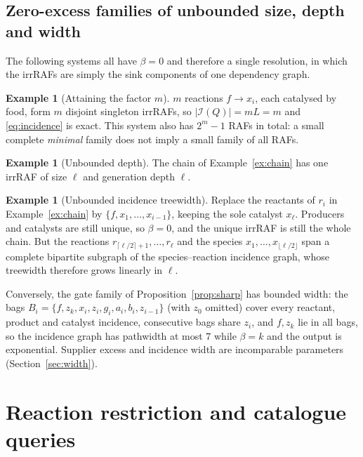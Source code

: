 \documentclass[11pt,a4paper]{article}
\theoremstyle{plain}
\theoremstyle{definition}
\newtheorem{example}[theorem]{Example}
\theoremstyle{remark}
\newcommand{\Irr}{\mathcal I}
\begin{document}
\subsection{Zero-excess families of unbounded size, depth and width}\label{sec:zerofamilies}

The following systems all have $\beta=0$ and therefore a single resolution, in which the irrRAFs are simply the sink components of one dependency graph.

\begin{example}[Attaining the factor $m$]
$m$ reactions $f\to x_i$, each catalysed by food, form $m$ disjoint singleton irrRAFs, so $|\Irr(Q)|=mL=m$ and \eqref{eq:incidence} is exact. This system also has $2^m-1$ RAFs in total: a small complete \emph{minimal} family does not imply a small family of all RAFs.
\end{example}

\begin{example}[Unbounded depth]
The chain of Example~\ref{ex:chain} has one irrRAF of size $\ell$ and generation depth $\ell$.
\end{example}

\begin{example}[Unbounded incidence treewidth]\label{ex:dense}
Replace the reactants of $r_i$ in Example~\ref{ex:chain} by $\{f,x_1,\ldots,x_{i-1}\}$, keeping the sole catalyst $x_\ell$. Producers and catalysts are still unique, so $\beta=0$, and the unique irrRAF is still the whole chain. But the reactions $r_{\lceil\ell/2\rceil+1},\ldots,r_\ell$ and the species $x_1,\ldots,x_{\lfloor\ell/2\rfloor}$ span a complete bipartite subgraph of the species--reaction incidence graph, whose treewidth therefore grows linearly in $\ell$.
\end{example}

Conversely, the gate family of Proposition~\ref{prop:sharp} has bounded width: the bags $B_i=\{f,z_k,x_i,z_i,g_i,a_i,b_i,z_{i-1}\}$ (with $z_0$ omitted) cover every reactant, product and catalyst incidence, consecutive bags share $z_i$, and $f,z_k$ lie in all bags, so the incidence graph has pathwidth at most $7$ while $\beta=k$ and the output is exponential. Supplier excess and incidence width are incomparable parameters (Section~\ref{sec:width}).

\section{Reaction restriction and catalogue queries}\label{sec:restriction}
\end{document}
